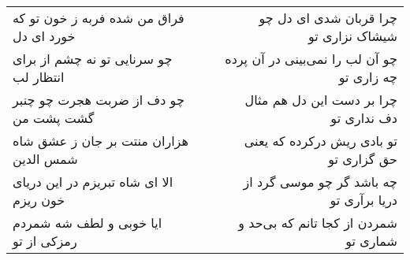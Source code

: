 \begin{center}
\begin{longtable}{l p{0.5cm} r}
فراق من شده فربه ز خون تو که خورد ای دل
&&
چرا قربان شدی ای دل چو شیشاک نزاری تو
\\
چو سرنایی تو نه چشم از برای انتظار لب
&&
چو آن لب را نمی‌بینی در آن پرده چه زاری تو
\\
چو دف از ضربت هجرت چو چنبر گشت پشت من
&&
چرا بر دست این دل هم مثال دف نداری تو
\\
هزاران منتت بر جان ز عشق شاه شمس الدین
&&
تو بادی ریش درکرده که یعنی حق گزاری تو
\\
الا ای شاه تبریزم در این دریای خون ریزم
&&
چه باشد گر چو موسی گرد از دریا برآری تو
\\
ایا خوبی و لطف شه شمردم رمزکی از تو
&&
شمردن از کجا تانم که بی‌حد و شماری تو
\\
\end{longtable}
\end{center}
